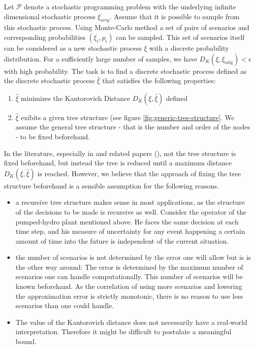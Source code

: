 \documentclass[a4paper, 12pt] {article}
\begin{document}
Let $\mathcal{P}$ denote a stochastic programming problem with the underlying infinite dimensional stochastic process $\xi_{orig}$.
Assume that it is possible to sample from this stochastic process.
Using Monte-Carlo method a set of pairs of scenarios and corresponding probabilities $(\xi_i,p_i)$ can be sampled.
This set of scenarios itself can be considered as a new stochastic process $\xi$ with a discrete probability distribution.
For a sufficiently large number of samples, we have $D_K(\xi,\xi_{\mathrm{orig}})<\epsilon$ with high probability.
The task is to find a discrete stochastic process defined as the discrete stochastic process $\hat{\xi}$ that satisfies the following properties:
\begin{enumerate}
\item $\hat{\xi}$ minimizes the Kantorovich Distance $D_K(\xi,\hat{\xi})$ defined 
\item $\hat{\xi}$ exibits a given tree structure (see figure \ref{fig:generic-tree-structure}. We assume the general tree structure - that is the number and order of the nodes - to be fixed beforehand. 
\end{enumerate}
In the literature, especially in \cite{Heitsch2009} and related papers (\cite{Dupacova2003}), not the tree structure is fixed beforehand, but instead the tree is reduced until a maximum distance $D_K(\xi,\hat{\xi})$ is reached. However, we believe that the approach of fixing the tree structure beforehand is a sensible assumption for the following reasons.
\begin{itemize}
\item a recursive tree structure makes sense in most applications, as the structure of the decisions to be made is recursive as well. Consider the operator of the pumped-hydro plant mentioned above. He faces the same decision at each time step, and his measure of uncertainty for any event happening a certain amount of time into the future is independent of the current situation.
\item the number of scenarios is not determined by the error one will allow but is is the other way around: The error is determined by the maximum number of scenarios one can handle computationally. This number of scenarios will be known beforehand. As the correlation of using more scenarios and lowering the approximation error is strictly monotonic, there is no reason to use less scenarios than one could handle.
\item The value of the Kantorovich distance does not necessarily have a real-world interpretation. Therefore it might be difficult to postulate a meaningful bound.
\end{itemize}
\end{document}
